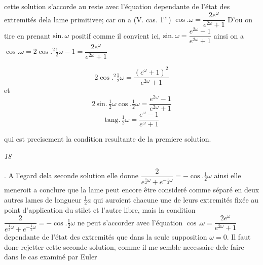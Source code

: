 \documentclass[11pt,a4paper]{article}
\begin{document}
cette solution s'accorde au reste avec l'équation dependante de l'état des
extremités dela lame primitivee; car on a (V. cas. 1\textsuperscript{er})
$\cos.\omega=\dfrac{2e^{\omega}}{e^{2\omega}+1}$ D'ou on tire en prenant
$\text{sin.}\,\omega$ positif comme il convient ici,
$\text{sin.}\,\omega=\dfrac{e^{2\omega}-1}{e^{2\omega}+1}$ ainsi on a
$\cos.\omega=2\cos.^2\tfrac{1}{2}\omega-1=\dfrac{2e^{\omega}}{e^{2\omega}+1}$

\[ 2\cos.^2\tfrac{1}{2}\omega=\frac{(e^{\omega}+1)^2}{e^{2\omega}+1} \]
et
\[ 2\,\text{sin.}\,\tfrac{1}{2}\omega\cos.\tfrac{1}{2}\omega=\frac{e^{2\omega}-1}{e^{2\omega}+1} \]
\[ \text{tang.}\,\tfrac{1}{2}\omega=\frac{e^{\omega}-1}{e^{\omega}+1} \]

qui est precisement la condition resultante de la premiere solution.

\emph{18}

\struck{\ill{}}. A l'egard dela seconde  solution elle donne
$\dfrac{2}{e^{\frac{1}{2}\omega}+e^{-\frac{1}{2}\omega}}=-\cos.\tfrac{1}{2}\omega$
ainsi elle meneroit a conclure que la lame peut encore être consideré comme
séparé en deux autres lames de longueur $\frac{1}{2}a$ qui auroient chacune
une de leurs extremités fixée au point d'application du stilet et l'autre
libre, mais la condition
$\dfrac{2}{e^{\frac{1}{2}\omega}+e^{-\frac{1}{2}\omega}}=-\cos.\tfrac{1}{2}\omega$
ne peut s'accorder avec l'équation
$\cos.\omega=\dfrac{2e^{\omega}}{e^{2\omega}+1}$ dependante de l'état des
extremités que dans la seule supposition $\omega=0$. Il faut donc rejetter
cette seconde solution, comme il me semble necessaire dele faire dans le cas
examiné par Euler
\end{document}
